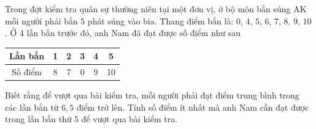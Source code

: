 \begin{bt}%
	Trong đợt kiểm tra quân sự thường niên tại một đơn vị, ở bộ môn bắn súng AK mỗi người phải bắn 5 phát súng vào bia. Thang điểm bắn là: $0$, $4$, $5$, $6$, $7$, $8$, $9$, $10$. Ở $ 4 $ lần bắn trước đó, anh Nam đã đạt được số điểm như sau
	\begin{center}
		\begin{tabular}{|c|c|c|c|c|c|}
			\hline
			Lần bắn & 1 & 2 & 3 & 4 & 5\\
			\hline
			Số điểm & 8 & 7 & 0 & 9 &10 \\
			\hline
		\end{tabular}
	\end{center}
	Biết rằng để vượt qua bài kiểm tra, mỗi người phải đạt điểm trung bình trong các lần bắn từ $6{,}5$ điểm trở lên. Tính số điểm ít nhất mà anh Nam cần đạt được trong lần bắn thứ 5 để vượt qua bài kiểm tra.
\end{bt}

